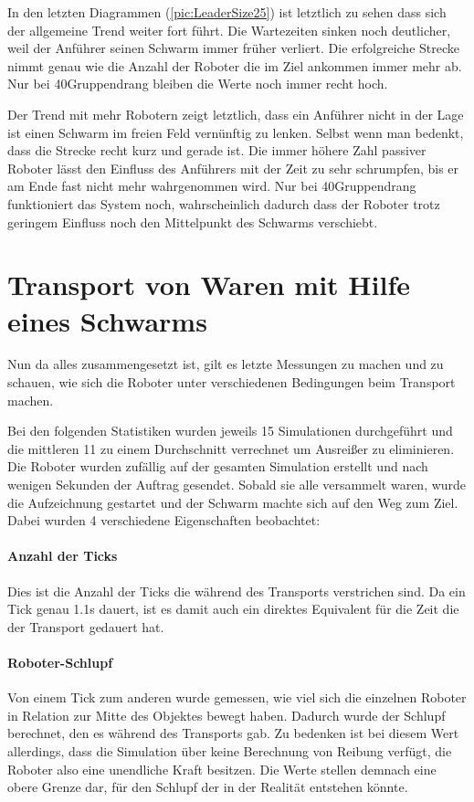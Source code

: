 In den letzten Diagrammen (\autoref{pic:LeaderSize25}) ist letztlich zu sehen dass sich der allgemeine Trend weiter fort führt. Die Wartezeiten sinken noch deutlicher, weil der Anführer seinen Schwarm immer früher verliert. Die erfolgreiche Strecke nimmt genau wie die Anzahl der Roboter die im Ziel ankommen immer mehr ab. Nur bei 40\per Gruppendrang bleiben die Werte noch immer recht hoch.

Der Trend mit mehr Robotern zeigt letztlich, dass ein Anführer nicht in der Lage ist einen Schwarm im freien Feld vernünftig zu lenken. Selbst wenn man bedenkt, dass die Strecke recht kurz und gerade ist. Die immer höhere Zahl passiver Roboter lässt den Einfluss des Anführers mit der Zeit zu sehr schrumpfen, bis er am Ende fast nicht mehr wahrgenommen wird. Nur bei 40\per Gruppendrang funktioniert das System noch, wahrscheinlich dadurch dass der Roboter trotz geringem Einfluss noch den Mittelpunkt des Schwarms verschiebt.









\section{Transport von Waren mit Hilfe eines Schwarms}\label{sec:EvaluationTransport}

Nun da alles zusammengesetzt ist, gilt es letzte Messungen zu machen und zu schauen, wie sich die Roboter unter verschiedenen Bedingungen beim Transport machen.

Bei den folgenden Statistiken wurden jeweils 15 Simulationen durchgeführt und die mittleren 11 zu einem Durchschnitt verrechnet um Ausreißer zu eliminieren. Die Roboter wurden zufällig auf der gesamten Simulation erstellt und nach wenigen Sekunden der Auftrag gesendet. Sobald sie alle versammelt waren, wurde die Aufzeichnung gestartet und der Schwarm machte sich auf den Weg zum Ziel. Dabei wurden 4 verschiedene Eigenschaften beobachtet:

\paragraph*{Anzahl der Ticks}
Dies ist die Anzahl der Ticks die während des Transports verstrichen sind. Da ein Tick genau 1.1s dauert, ist es damit auch ein direktes Equivalent für die Zeit die der Transport gedauert hat.

\paragraph*{Roboter-Schlupf}
Von einem Tick zum anderen wurde gemessen, wie viel sich die einzelnen Roboter in Relation zur Mitte des Objektes bewegt haben. Dadurch wurde der Schlupf berechnet, den es während des Transports gab. Zu bedenken ist bei diesem Wert allerdings, dass die Simulation über keine Berechnung von Reibung verfügt, die Roboter also eine unendliche Kraft besitzen. Die Werte stellen demnach eine obere Grenze dar, für den Schlupf der in der Realität entstehen könnte.

